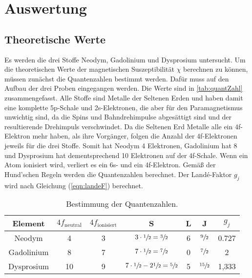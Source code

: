 \section{Auswertung}
\label{sec:Auswertung}
\subsection{Theoretische Werte}
\label{subsec:theoW}
Es werden die drei Stoffe Neodym, Gadolinium und Dysprosium untersucht. Um die theoretischen Werte der magnetischen Suszeptibilität $\chi$ berechnen zu können, müssen zunächst die Quantenzahlen bestimmt werden.
Dafür muss auf den Aufbau der drei Proben eingegangen werden. Die Werte sind in \autoref{tab:quantZahl} zusammengefasst.
Alle Stoffe sind Metalle der Seltenen Erden und haben damit eine komplette 5p-Schale und 2s-Elektronen, die aber für den Paramagnetismus unwichtig sind, da die Spins und Bahndrehimpulse abgesättigt sind
und der resultierende Drehimpuls verschwindet. Da die Seltenen Erd Metalle alle ein 4f-Elektron mehr haben, als ihre Vorgänger, folgen die Anzahl der 4f-Elektronen jeweils für die drei Stoffe.
Somit hat Neodym 4 Elektronen, Gadolinium hat 8  und Dysprosium hat dementsprechend 10 Elektronen auf der 4f-Schale.
Wenn ein Atom ionisiert wird, verliert es ein 6s- und ein 4f-Elektron.
Gemäß der Hund'schen Regeln werden die Quantenzahlen berechnet.
Der Landé-Faktor $g_j$ wird nach Gleichung (\ref{eqn:landeF}) berechnet.

\begin{table}[H]
  \centering
  \caption{Bestimmung der Quantenzahlen.}
  \label{tab:quantZahl}
  \begin{tabular}{c| c c c c c c}
    \toprule
    Element & $4f_{\text{neutral}}$ & $4f_{\text{ionisiert}}$ & S & L & J & $g_j$\\
    \midrule
    Neodym & 4 & 3 & $3\cdot\sfrac{1}{2}=\sfrac{3}{2}$ & 6 & $\sfrac{9}{2}$ & 0.727 \\
    Gadolinium & 8 & 7 & $7\cdot\sfrac{1}{2}=\sfrac{7}{2}$ & 0 & $\sfrac{7}{2}$ & 2 \\
    Dysprosium & 10 & 9 & $7\cdot\sfrac{1}{2}-2\sfrac{1}{2}=\sfrac{5}{2}$ & 5 & $\sfrac{15}{2}$ & 1,333 \\
    \bottomrule
  \end{tabular}
\end{table}

